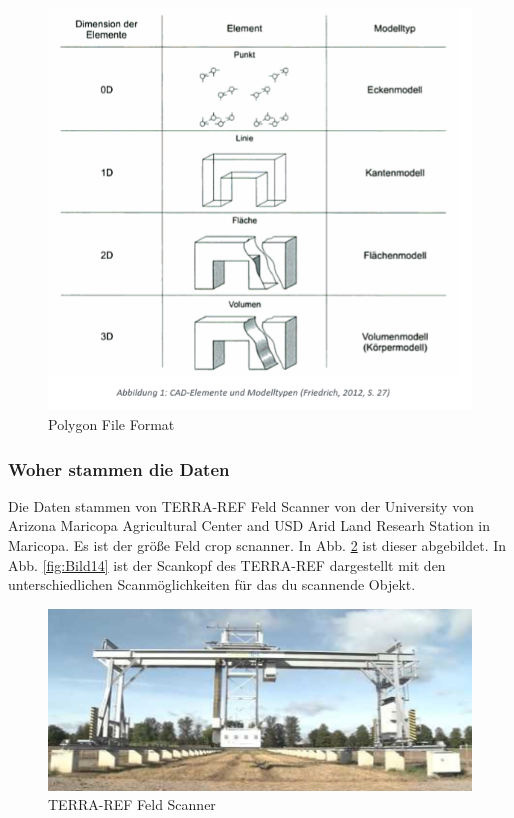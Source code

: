 \documentclass{llncs}
\begin{document}
\begin{figure}[htbp] 
	\centering
	\includegraphics[width=1.0\textwidth]{datenformat.png}
	\caption{Polygon File Format}
	\label{fig:Bild13}
\end{figure}

\subsubsection{Woher stammen die Daten}

Die Daten stammen von TERRA-REF Feld Scanner von der University von Arizona Maricopa Agricultural Center and USD Arid Land Researh Station in Maricopa. Es ist der größe Feld crop scnanner. In Abb. \ref{fig:Bild13} ist dieser abgebildet. In Abb. \ref{fig:Bild14} ist der Scankopf des TERRA-REF dargestellt mit den unterschiedlichen Scanmöglichkeiten für das du scannende Objekt. 
 
\begin{figure}[htbp] 
	\centering
	\includegraphics[width=1.0\textwidth]{lematech_1.png}
	\caption{TERRA-REF Feld Scanner}
	\label{fig:Bild13}
\end{figure}
\end{document}
